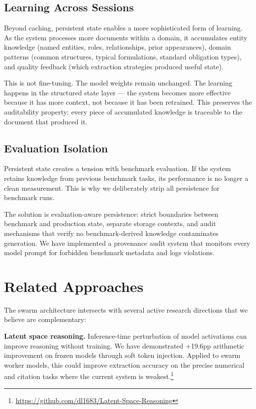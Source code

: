 \documentclass[11pt,a4paper]{article}
\begin{document}
\subsection{Learning Across Sessions}

Beyond caching, persistent state enables a more sophisticated form of learning. As the system processes more documents within a domain, it accumulates entity knowledge (named entities, roles, relationships, prior appearances), domain patterns (common structures, typical formulations, standard obligation types), and quality feedback (which extraction strategies produced useful state).

This is not fine-tuning. The model weights remain unchanged. The learning happens in the structured state layer — the system becomes more effective because it has more context, not because it has been retrained. This preserves the auditability property: every piece of accumulated knowledge is traceable to the document that produced it.

\subsection{Evaluation Isolation}

Persistent state creates a tension with benchmark evaluation. If the system retains knowledge from previous benchmark tasks, its performance is no longer a clean measurement. This is why we deliberately strip all persistence for benchmark runs.

The solution is evaluation-aware persistence: strict boundaries between benchmark and production state, separate storage contexts, and audit mechanisms that verify no benchmark-derived knowledge contaminates generation. We have implemented a provenance audit system that monitors every model prompt for forbidden benchmark metadata and logs violations.


\section{Related Approaches}

The swarm architecture intersects with several active research directions that we believe are complementary:

\textbf{Latent space reasoning.} Inference-time perturbation of model activations can improve reasoning without training. We have demonstrated +19.6pp arithmetic improvement on frozen models through soft token injection. Applied to swarm worker models, this could improve extraction accuracy on the precise numerical and citation tasks where the current system is weakest.\footnote{\url{https://github.com/dl1683/Latent-Space-Reasoning}}
\end{document}
